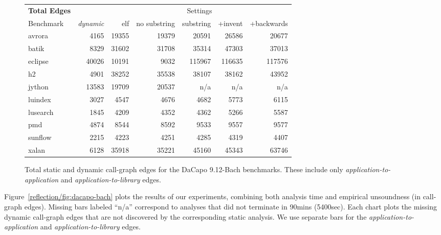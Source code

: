 \begin{figure}[h]
  \renewcommand{\tabcolsep}{1.5mm}
  \centering
  \begin{tabular}{lr@{ \quad }rrrrr}
    \toprule
    \textbf{Total Edges} & & \multicolumn{5}{c}{Settings} \\
    \cmidrule(l){3-7}
    Benchmark & \emph{dynamic} & elf & no substring 
              & substring & +invent & +backwards
    \\
    \midrule
    avrora & 4165 & 19355 & 19379 & 20591 & 26586 & 20677 \\
    batik & 8329 & 31602 & 31708 & 35314 & 47303 & 37013 \\
    eclipse & 40026 & 10191 & 9032 & 115967 & 116635 & 117576 \\
    h2 & 4901 & 38252 & 35538 & 38107 & 38162 & 43952 \\
    jython & 13583 & 19709 & 20537 & n/a & n/a & n/a \\
    luindex & 3027 & 4547 & 4676 & 4682 & 5773 & 6115 \\
    lusearch & 1845 & 4209 & 4352 & 4362 & 5266 & 5587 \\
    pmd & 4874 & 8544 & 8592 & 9533 & 9557 & 9577 \\
    sunflow & 2215 & 4223 & 4251 & 4285 & 4319 & 4407 \\
    xalan & 6128 & 35918 & 35221 & 45160 & 45343 & 63746 \\
    \bottomrule
  \end{tabular}
  \caption[Total static and dynamic call-graph edges -- DaCapo
  9.12-Bach benchmarks]{Total static and dynamic call-graph edges for
    the DaCapo 9.12-Bach benchmarks. These include only
    \emph{application-to-application} and
    \emph{application-to-library} edges.}
  \label{reflection/fig:total_static}
\end{figure}


Figure~\ref{reflection/fig:dacapo-bach} plots the results of our experiments,
combining both analysis time and empirical unsoundness (in call-graph
edges). 
Missing bars labeled ``n/a'' correspond to analyses
that did not terminate in 90mins (5400sec).
%
Each chart plots the
missing dynamic call-graph edges that are not discovered by the
corresponding static analysis. We use separate bars for the
\emph{application-to-application} and \emph{application-to-library}
edges.

